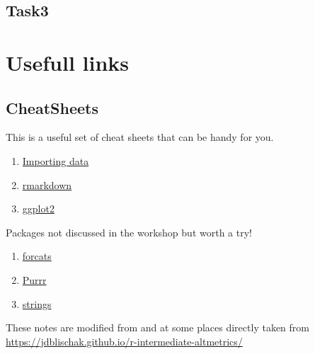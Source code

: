 \documentclass[
]{book}
\providecommand{\tightlist}{%
  \setlength{\itemsep}{0pt}\setlength{\parskip}{0pt}}
\begin{document}
\hypertarget{task3}{%
\section{Task3}\label{task3}}

\hypertarget{usefull-links}{%
\chapter{Usefull links}\label{usefull-links}}

\hypertarget{cheatsheets}{%
\section{CheatSheets}\label{cheatsheets}}

This is a useful set of cheat sheets that can be handy for you.

\begin{enumerate}
\def\labelenumi{\arabic{enumi}.}
\tightlist
\item
  \href{img/data-import.pdf}{Importing data}
\item
  \href{img/rmarkdown-2.0.pdf}{rmarkdown}
\item
  \href{img/ggplot2-cheatsheet.pdf}{ggplot2}
\end{enumerate}

Packages not discussed in the workshop but worth a try!

\begin{enumerate}
\def\labelenumi{\arabic{enumi}.}
\tightlist
\item
  \href{img/factors.pdf}{forcats}
\item
  \href{img/purrr.pdf}{Purrr}
\item
  \href{img/strings.pdf}{strings}
\end{enumerate}

These notes are modified from and at some places directly taken from \url{https://jdblischak.github.io/r-intermediate-altmetrics/}

  
\end{document}
